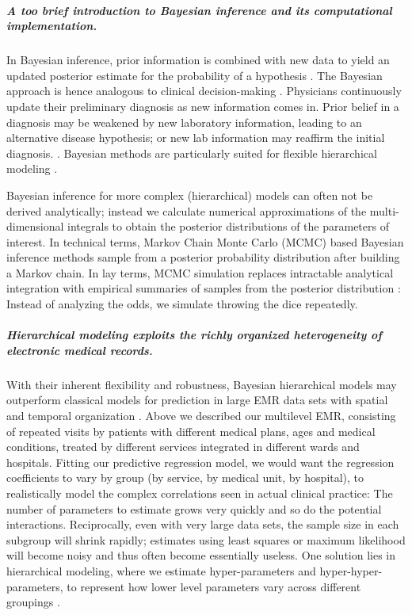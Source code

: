 \documentclass[11pt,notitlepage]{article}
\begin{document}
\subparagraph*{A too brief introduction to Bayesian inference and its computational implementation.}
In Bayesian inference, prior information is combined with new data to yield an updated posterior estimate for the probability of a hypothesis \cite{Kruschke_Book_2014}. The Bayesian approach is hence analogous to clinical decision-making \cite{Spiegelhalter_11134920}. Physicians continuously update their preliminary diagnosis as new information comes in. Prior belief in a diagnosis may be weakened by new laboratory information, leading to an alternative disease hypothesis; or new lab information may reaffirm the initial diagnosis. \cite{Kruschke_22774788}. Bayesian methods are particularly suited for flexible hierarchical modeling \cite{Carlin_1349763,Sutton_2012}. 

Bayesian inference for more complex (hierarchical) models can often not be derived analytically; instead we calculate numerical approximations of the multi-dimensional integrals to obtain the posterior distributions of the parameters of interest. In technical terms, Markov Chain Monte Carlo (MCMC) based Bayesian inference methods sample from a posterior probability distribution after building a Markov chain. In lay terms, MCMC simulation replaces intractable analytical integration with empirical summaries of samples from the posterior distribution \cite{Abrams_9483729}: Instead of analyzing the odds, we simulate throwing the dice repeatedly. 

\subparagraph{Hierarchical modeling exploits the richly organized heterogeneity of electronic medical records.}
With their inherent flexibility and robustness, Bayesian hierarchical models may outperform classical models for prediction in large EMR data sets with spatial and temporal organization \cite{Gelman_red_2009}. Above we described our multilevel EMR, consisting of repeated visits by patients with different medical plans, ages and medical conditions, treated by different services integrated in different wards and hospitals. Fitting our predictive regression model, we would want the regression coefficients to vary by group (by service, by medical unit, by hospital), to realistically model the complex correlations seen in actual clinical practice: The number of parameters to estimate grows very quickly and so do the potential interactions. Reciprocally, even with very large data sets, the sample size in each subgroup will shrink rapidly; estimates using least squares or maximum likelihood will become noisy and thus often become essentially useless. One solution lies in hierarchical modeling, where we estimate hyper-parameters and hyper-hyper-parameters, to represent how lower level parameters vary across different groupings \cite{Bafumi_Gelman_2007}.
\end{document}
